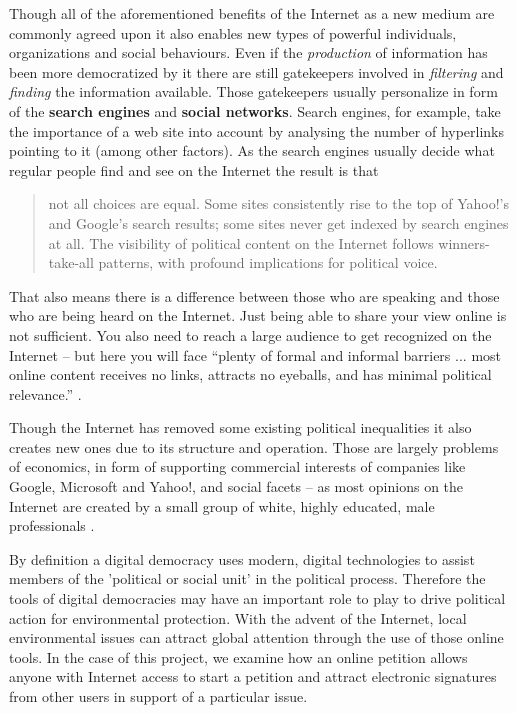 Though all of the aforementioned benefits of the Internet as a new medium are commonly agreed upon it also enables new types of powerful individuals, organizations and social behaviours. Even if the \textit{production} of information has been more democratized by it there are still gatekeepers involved in \textit{filtering} and \textit{finding} the information available. Those gatekeepers usually personalize in form of the \textbf{search engines} and \textbf{social networks}. Search engines, for example, take the importance of a web site into account by analysing the number of hyperlinks pointing to it (among other factors). As the search engines usually decide what regular people find and see on the Internet the result is that\begin{quote}not all choices are equal. Some sites consistently rise to the top of Yahoo!'s and Google's search results; some sites never get indexed by search engines at all. The visibility of political content on the Internet follows winners-take-all patterns, with profound implications for political voice. \citep[pg. 15]{Hindman09}\end{quote}That also means there is a difference between those who are speaking and those who are being heard on the Internet. Just being able to share your view online is not sufficient. You also need to reach a large audience to get recognized on the Internet -- but here you will face ``plenty of formal and informal barriers ... most online content receives no links, attracts no eyeballs, and has minimal political relevance.'' \citep[pg. 18]{Hindman09}.\par\vspace{0.2cm}

Though the Internet has removed some existing political inequalities it also creates new ones due to its structure and operation. Those are largely problems of economics, in form of supporting commercial interests of companies like Google, Microsoft and Yahoo!, and social facets -- as most opinions on the Internet are created by a small group of white, highly educated, male professionals \citep[pg. 18f]{Hindman09}. \par \vspace{0.2cm}

By definition a digital democracy uses modern, digital technologies to assist members of the 'political or social unit' in the political process. Therefore the tools of digital democracies may have an important role to play to drive political action for environmental protection. With the advent of the Internet, local environmental issues can attract global attention through the use of those online tools. In the case of this project, we examine how an online petition allows anyone with Internet access to start a petition and attract electronic signatures from other users in support of a particular issue.\par \vspace{0.2cm}

